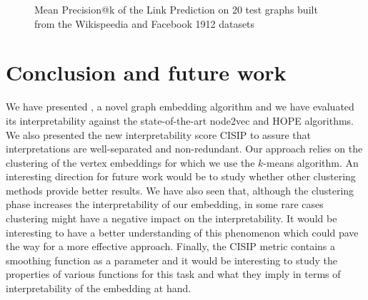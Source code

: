 \begin{figure}
   \centering
    \caption[Precision@k results of the Link Prediction experiment]{Mean Precision@k of the Link Prediction on 20 test graphs built from the Wikispeedia and Facebook 1912 datasets}
    \label{fig:lp_results}
\end{figure}

\section{Conclusion and future work}\label{sec:conclusion}
We have presented \parfaite, a novel graph embedding algorithm and we have evaluated its interpretability against the state-of-the-art node2vec and HOPE algorithms. We also presented the new interpretability score CISIP to assure that interpretations are well-separated and non-redundant.
Our approach relies on the clustering of the vertex embeddings for which we use the $k$-means algorithm. An interesting direction for future work would be to study whether other clustering methods provide better results. We have also seen that, although the clustering phase increases the interpretability of our embedding, in some rare cases clustering might have a negative impact on the interpretability. It would be interesting to have a better understanding of this phenomenon which could pave the way for a more effective approach.  Finally, the CISIP metric contains a smoothing function as a parameter and it would be interesting to study the properties of various functions for this task and what they imply in terms of interpretability of the embedding at hand.

